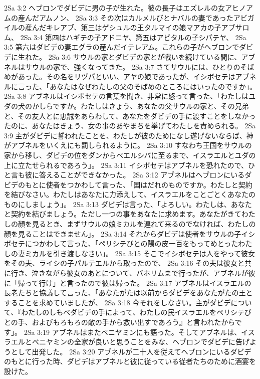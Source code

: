 2Sa 3:2  ヘブロンでダビデに男の子が生れた。彼の長子はエズレルの女アヒノアムの産んだアムノン、
2Sa 3:3  その次はカルメルびとナバルの妻であったアビガイルの産んだキレアブ、第三はゲシュルの王タルマイの娘マアカの子アブサロム、
2Sa 3:4  第四はハギテの子アドニヤ、第五はアビタルの子シパテヤ、
2Sa 3:5  第六はダビデの妻エグラの産んだイテレアム。これらの子がヘブロンでダビデに生れた。
2Sa 3:6  サウルの家とダビデの家とが戦いを続けている間に、アブネルはサウルの家で、強くなってきた。
2Sa 3:7  さてサウルには、ひとりのそばめがあった。その名をリヅパといい、アヤの娘であったが、イシボセテはアブネルに言った、「あなたはなぜわたしの父のそばめのところにはいったのですか」。
2Sa 3:8  アブネルはイシボセテの言葉を聞き、非常に怒って言った、「わたしはユダの犬のかしらですか。わたしはきょう、あなたの父サウルの家と、その兄弟と、その友人とに忠誠をあらわして、あなたをダビデの手に渡すことをしなかったのに、あなたはきょう、女の事のあやまちを挙げてわたしを責められる。
2Sa 3:9  主がダビデに誓われたことを、わたしが彼のためになし遂げないならば、神がアブネルをいくえにも罰しられるように。
2Sa 3:10  すなわち王国をサウルの家から移し、ダビデの位をダンからベエルシバに至るまで、イスラエルとユダの上に立たせられるであろう」。
2Sa 3:11  イシボセテはアブネルを恐れたので、ひと言も彼に答えることができなかった。
2Sa 3:12  アブネルはヘブロンにいるダビデのもとに使者をつかわして言った、「国はだれのものですか。わたしと契約を結びなさい。わたしはあなたに力添えして、イスラエルをことごとくあなたのものにしましょう」。
2Sa 3:13  ダビデは言った、「よろしい。わたしは、あなたと契約を結びましょう。ただし一つの事をあなたに求めます。あなたがきてわたしの顔を見るとき、まずサウルの娘ミカルを連れて来るのでなければ、わたしの顔を見ることはできません」。
2Sa 3:14  それからダビデは使者をサウルの子イシボセテにつかわして言った、「ペリシテびとの陽の皮一百をもってめとったわたしの妻ミカルを引き渡しなさい」。
2Sa 3:15  そこでイシボセテは人をやって彼女をその夫、ライシの子パルテエルから取ったので、
2Sa 3:16  その夫は彼女と共に行き、泣きながら彼女のあとについて、バホリムまで行ったが、アブネルが彼に「帰って行け」と言ったので彼は帰った。
2Sa 3:17  アブネルはイスラエルの長老たちと協議して言った、「あなたがたは以前からダビデをあなたがたの王とすることを求めていましたが、
2Sa 3:18  今それをしなさい。主がダビデについて、『わたしのしもべダビデの手によって、わたしの民イスラエルをペリシテびとの手、およびもろもろの敵の手から救い出すであろう』と言われたからです」。
2Sa 3:19  アブネルはまたベニヤミンにも語った。そしてアブネルは、イスラエルとベニヤミンの全家が良いと思うことをみな、ヘブロンでダビデに告げようとして出発した。
2Sa 3:20  アブネルが二十人を従えてヘブロンにいるダビデのもとに行った時、ダビデはアブネルと彼に従っている従者たちのために酒宴を設けた。
